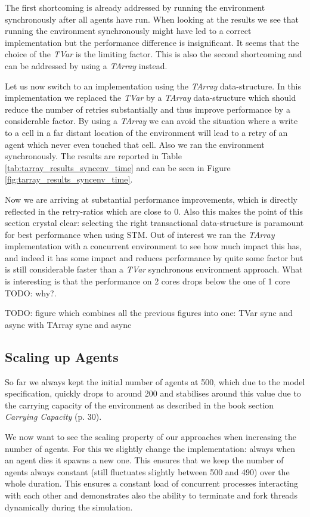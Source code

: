 The first shortcoming is already addressed by running the environment synchronously after all agents have run. When looking at the results we see that running the environment synchronously might have led to a correct implementation but the performance difference is insignificant. It seems that the choice of the \textit{TVar} is the limiting factor. This is also the second shortcoming and can be addressed by using a \textit{TArray} instead. 

Let us now switch to an implementation using the \textit{TArray} data-structure. In this implementation we replaced the \textit{TVar} by a \textit{TArray} data-structure which should reduce the number of retries substantially and thus improve performance by a considerable factor. By using a \textit{TArray} we can avoid the situation where a write to a cell in a far distant location of the environment will lead to a retry of an agent which never even touched that cell. Also we ran the environment synchronously. The results are reported in Table \ref{tab:tarray_results_syncenv_time} and can be seen in Figure \ref{fig:tarray_results_syncenv_time}.

Now we are arriving at substantial performance improvements, which is directly reflected in the retry-ratios which are close to 0. Also this makes the point of this section crystal clear: selecting the right transactional data-structure is paramount for best performance when using STM. Out of interest we ran the \textit{TArray} implementation with a concurrent environment to see how much impact this has, and indeed it has some impact and reduces performance by quite some factor but is still considerable faster than a \textit{TVar} synchronous environment approach. What is interesting is that the performance on 2 cores drops below the one of 1 core TODO: why?.

TODO: figure which combines all the previous figures into one: TVar sync and async with TArray sync and async

\subsection{Scaling up Agents}
So far we always kept the initial number of agents at 500, which due to the model specification, quickly drops to around 200 and stabilises around this value due to the carrying capacity of the environment as described in the book \cite{epstein_growing_1996} section \textit{Carrying Capacity} (p. 30).

We now want to see the scaling property of our approaches when increasing the number of agents. For this we slightly change the implementation: always when an agent dies it spawns a new one. This ensures that we keep the number of agents always constant (still fluctuates slightly between 500 and 490) over the whole duration. This ensures a constant load of concurrent processes interacting with each other and demonstrates also the ability to terminate and fork threads dynamically during the simulation.

